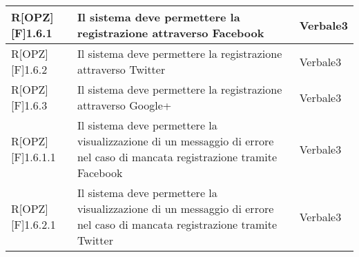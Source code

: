 \begin{table}[h]
\begin{tabular}{|p{}|p{}|p{}|}
			R[OPZ][F]1.6.1 & Il sistema deve permettere la registrazione attraverso \gls{Facebook} & Verbale3 \\ \midrule
			R[OPZ][F]1.6.2 & Il sistema deve permettere la registrazione attraverso Twitter & Verbale3 \\ \midrule
			R[OPZ][F]1.6.3 & Il sistema deve permettere la registrazione attraverso Google+ & Verbale3 \\ \midrule
			R[OPZ][F]1.6.1.1 & Il sistema deve permettere la visualizzazione di un messaggio di errore nel caso di mancata registrazione tramite \gls{Facebook} & Verbale3 \\ \midrule
			R[OPZ][F]1.6.2.1 & Il sistema deve permettere la visualizzazione di un messaggio di errore nel caso di mancata registrazione tramite Twitter & Verbale3 \\ \midrule
	
	\end{tabular}
	\end{table}
	\newpage
	
